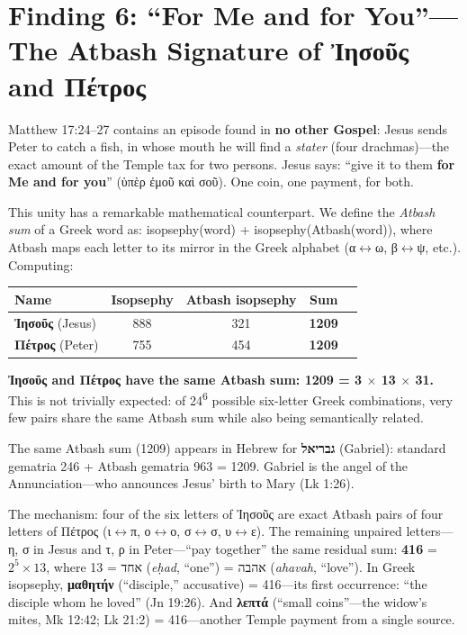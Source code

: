\documentclass[12pt,a4paper]{article}
\begin{document}
\section{Finding 6: ``For Me and for You''---The Atbash Signature of Ἰησοῦς and Πέτρος}
\label{sec:fish}

Matthew 17:24--27 contains an episode found in \textbf{no other Gospel}: Jesus sends Peter to catch a fish, in whose mouth he will find a \textit{stater} (four drachmas)---the exact amount of the Temple tax for two persons. Jesus says: ``give it to them \textbf{for Me and for you}'' (ὑπὲρ ἐμοῦ καὶ σοῦ). One coin, one payment, for both.

This unity has a remarkable mathematical counterpart. We define the \textit{Atbash sum} of a Greek word as: isopsephy(word) + isopsephy(Atbash(word)), where Atbash maps each letter to its mirror in the Greek alphabet (α$\leftrightarrow$ω, β$\leftrightarrow$ψ, etc.). Computing:

\begin{center}
\begin{tabular}{lcccl}
\toprule
\textbf{Name} & \textbf{Isopsephy} & \textbf{Atbash isopsephy} & \textbf{Sum} \\
\midrule
\textbf{Ἰησοῦς} (Jesus) & 888 & 321 & \textbf{1209} \\
\textbf{Πέτρος} (Peter) & 755 & 454 & \textbf{1209} \\
\bottomrule
\end{tabular}
\end{center}

\textbf{Ἰησοῦς and Πέτρος have the same Atbash sum: 1209 = 3 $\times$ 13 $\times$ 31.} This is not trivially expected: of 24\textsuperscript{6} possible six-letter Greek combinations, very few pairs share the same Atbash sum while also being semantically related.

The same Atbash sum (1209) appears in Hebrew for \textbf{גבריאל} (Gabriel): standard gematria 246 + Atbash gematria 963 = 1209. Gabriel is the angel of the Annunciation---who announces Jesus' birth to Mary (Lk 1:26).

The mechanism: four of the six letters of Ἰησοῦς are exact Atbash pairs of four letters of Πέτρος (ι$\leftrightarrow$π, ο$\leftrightarrow$ο, σ$\leftrightarrow$σ, υ$\leftrightarrow$ε). The remaining unpaired letters---η, σ in Jesus and τ, ρ in Peter---``pay together'' the same residual sum: \textbf{416} = $2^5 \times 13$, where 13 = אחד (\textit{eḥad}, ``one'') = אהבה (\textit{ahavah}, ``love''). In Greek isopsephy, \textbf{μαθητήν} (``disciple,'' accusative) = 416---its first occurrence: ``the disciple whom he loved'' (Jn 19:26). And \textbf{λεπτά} (``small coins''---the widow's mites, Mk 12:42; Lk 21:2) = 416---another Temple payment from a single source.
\end{document}
